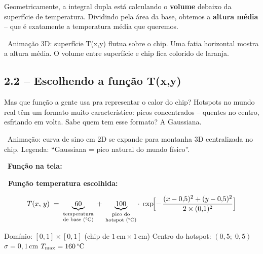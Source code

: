 \begin{fala}
Geometricamente, a integral dupla está calculando o \textbf{volume} debaixo
da superfície de temperatura. Dividindo pela área da base, obtemos a
\textbf{altura média} -- que é exatamente a temperatura média que queremos.
\end{fala}

\begin{visual}
\faFilm\ Animação 3D: superfície T(x,y) flutua sobre o chip. Uma fatia horizontal
mostra a altura média. O volume entre superfície e chip fica colorido de laranja.
\end{visual}

\subsection{2.2 -- Escolhendo a função T(x,y)}

\begin{fala}
Mas que função a gente usa pra representar o calor do chip?
Hotspots no mundo real têm um formato muito característico:
picos concentrados -- quentes no centro, esfriando em volta.
Sabe quem tem esse formato? A Gaussiana.
\end{fala}

\begin{visual}
\faFilm\ Animação: curva de sino em 2D se expande para montanha 3D centralizada no chip.
Legenda: ``Gaussiana = pico natural do mundo físico''.
\end{visual}

\begin{tela}
\faDesktop\ \textbf{Função na tela:}
\end{tela}

\begin{mathblock}
\textbf{\color{corMath}\faSuperscript\ Função temperatura escolhida:}

\[
  T(x,\,y)
  \;=\;
  \underbrace{60}_{\substack{\text{temperatura}\\\text{de base ({\textdegree}C)}}}
  \;+\;
  \underbrace{100}_{\substack{\text{pico do}\\\text{hotspot ({\textdegree}C)}}}
  \cdot\;
  \exp\!\Bigl[
    -\,\frac{(x-0{,}5)^2 + (y-0{,}5)^2}{2\times(0{,}1)^2}
  \Bigr]
\]

\vspace{6pt}
{\small\color{gray}
Domínio: $[0,1]\times[0,1]$ (chip de $1\,\text{cm} \times 1\,\text{cm}$) \quad
Centro do hotspot: $(0{,}5;\;0{,}5)$ \quad
$\sigma = 0{,}1\,\text{cm}$ \quad
$T_{\max} = 160\,\text{\textdegree C}$}
\end{mathblock}

